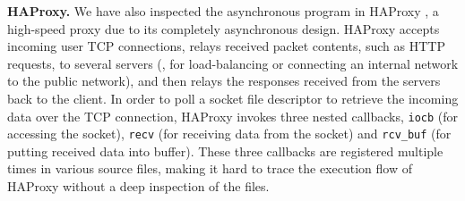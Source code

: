 

\vspace{1mm}
\noindent\textbf{HAProxy.}
 We have also inspected the asynchronous program in HAProxy \cite{haproxy}, a high-speed proxy due to its completely asynchronous design. HAProxy accepts incoming user TCP connections, relays received packet contents, such as HTTP requests, to several servers (\eg, for load-balancing or connecting an internal network to the public network), and then relays the responses received from the servers back to the client.
 In order to poll a socket file descriptor to retrieve the incoming data over the TCP connection, HAProxy invokes three nested callbacks, \lstinline[style=InlineStyle]{iocb} (for accessing the socket), \lstinline[style=InlineStyle]{recv} (for receiving data from the socket) and \lstinline[style=InlineStyle]{rcv_buf} (for putting received data into buffer). These three callbacks are registered multiple times in various source files, making it hard to trace the execution flow of HAProxy without a deep inspection of the files.




